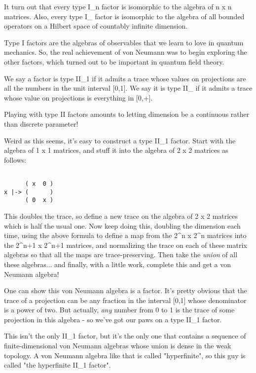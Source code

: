It turn out that every type I_{n} factor is isomorphic to the
algebra of n x n matrices.  Also, every type I_{\infty } factor
is isomorphic to the algebra of all bounded operators on a Hilbert space
of countably infinite dimension.

Type I factors are the algebras of observables that we learn to love in
quantum mechanics.  So, the real achievement of von Neumann was to begin
exploring the other factors, which turned out to be important in quantum
field theory.

We say a factor is type II_{1} if it admits a trace
whose values on projections are all the numbers in the unit interval
[0,1].  We say it is type II_{\infty } if it admits
a trace whose value on projections is everything in [0,+\infty ].

Playing with type II factors amounts to letting dimension be a
continuous rather than discrete parameter!  


Weird as this seems, it's easy to construct a type II_{1}
factor.  Start with the algebra of 1 x 1 matrices, and stuff it into the
algebra of 2 x 2 matrices as follows:


\begin{verbatim}

      ( x  0 ) 
x |-> (      )
      ( 0  x )
\end{verbatim}
    
This doubles the trace, so define a new trace on the algebra of 2 x 2
matrices which is half the usual one.  Now keep doing this, doubling the
dimension each time, using the above formula to define a map from the
2^{n} x 2^{n} matrices into the 2^{n+1} x
2^{n+1} matrices, and normalizing the trace on each of these
matrix algebras so that all the maps are trace-preserving.  Then take
the \emph{union} of all these algebras... and finally, with a little work,
complete this and get a von Neumann algebra!

One can show this von Neumann algebra is a factor.  It's pretty
obvious that the trace of a projection can be any fraction in the
interval [0,1] whose denominator is a power of two.  But actually, 
\emph{any} number from 0 to 1 is the trace of some projection in this
algebra - so we've got our paws on a type II_{1} factor.

This isn't the only II_{1} factor, but it's the only one that
contains a sequence of finite-dimensional von Neumann algebras whose
union is dense in the weak topology.  A von Neumann algebra like that is
called "hyperfinite", so this guy is called "the
hyperfinite II_{1} factor".


